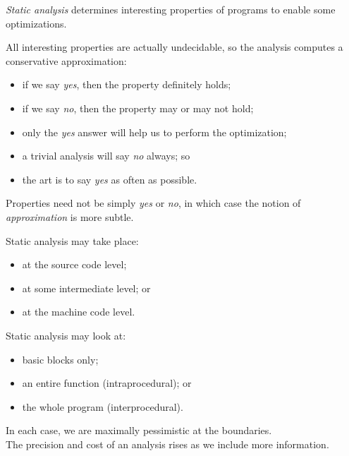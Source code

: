 \begin{slide*}
{\em Static analysis\/} determines interesting properties of programs to enable
some optimizations.

All interesting properties are actually undecidable, so the analysis computes
a conservative approximation:
\begin{itemize}
\item if we say {\em yes}, then the property definitely holds;
\item if we say {\em no}, then the property may or may not hold;
\item only the {\em yes\/} answer will help us to perform the optimization;
\item a trivial analysis will say {\em no\/} always; so
\item the art is to say {\em yes\/} as often as possible.
\end{itemize}
Properties need not be simply {\em yes\/} or {\em no}, in which case the
notion of {\em approximation\/} is more subtle.
\vfil
\end{slide*}
 
\begin{slide*}
Static analysis may take place:
\begin{itemize}
\item at the source code level;
\item at some intermediate level; or
\item at the machine code level.
\end{itemize}
\vspace*{2em}

Static analysis may look at:
\begin{itemize}
\item basic blocks only;
\item an entire function (intraprocedural); or
\item the whole program (interprocedural).
\end{itemize}
In each case, we are maximally pessimistic at the boundaries.\\

The precision and cost of an analysis rises as we include more information.
\vfil
\end{slide*}

